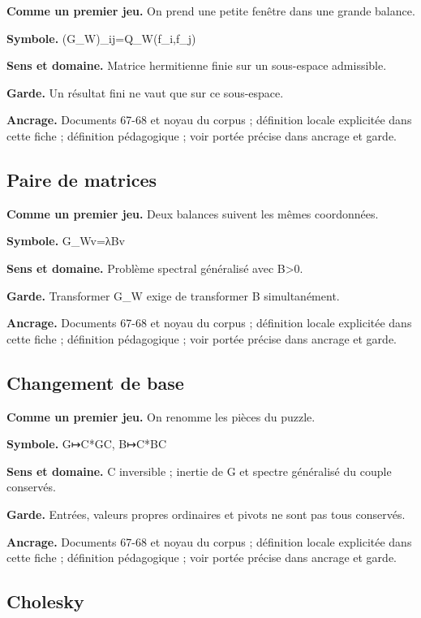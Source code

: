 \documentclass[
  9pt,
  a4paper,
]{article}
\begin{document}
\textbf{Comme un premier jeu.} On prend une petite fenêtre dans une
grande balance.

\textbf{Symbole.} (G\_W)\_ij=Q\_W(f\_i,f\_j)

\textbf{Sens et domaine.} Matrice hermitienne finie sur un sous-espace
admissible.

\textbf{Garde.} Un résultat fini ne vaut que sur ce sous-espace.

\textbf{Ancrage.} Documents 67-68 et noyau du corpus ; définition locale
explicitée dans cette fiche ; définition pédagogique ; voir portée
précise dans ancrage et garde.

\hypertarget{paire-de-matrices}{%
\subsection{Paire de matrices}\label{paire-de-matrices}}

\textbf{Comme un premier jeu.} Deux balances suivent les mêmes
coordonnées.

\textbf{Symbole.} G\_Wv=λBv

\textbf{Sens et domaine.} Problème spectral généralisé avec
B\textgreater0.

\textbf{Garde.} Transformer G\_W exige de transformer B simultanément.

\textbf{Ancrage.} Documents 67-68 et noyau du corpus ; définition locale
explicitée dans cette fiche ; définition pédagogique ; voir portée
précise dans ancrage et garde.

\hypertarget{changement-de-base}{%
\subsection{Changement de base}\label{changement-de-base}}

\textbf{Comme un premier jeu.} On renomme les pièces du puzzle.

\textbf{Symbole.} G↦C*GC, B↦C*BC

\textbf{Sens et domaine.} C inversible ; inertie de G et spectre
généralisé du couple conservés.

\textbf{Garde.} Entrées, valeurs propres ordinaires et pivots ne sont
pas tous conservés.

\textbf{Ancrage.} Documents 67-68 et noyau du corpus ; définition locale
explicitée dans cette fiche ; définition pédagogique ; voir portée
précise dans ancrage et garde.

\hypertarget{cholesky}{%
\subsection{Cholesky}\label{cholesky}}
\end{document}
